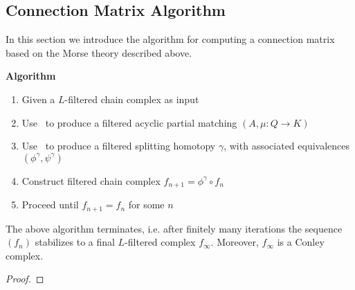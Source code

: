 \subsection{Connection Matrix Algorithm}

In this section we introduce the algorithm for computing a connection matrix based on the Morse theory described above.

{\bf Algorithm}
\begin{enumerate}
\item Given a $L$-filtered chain complex as input
\item Use~\cite[Algorithm 3.6]{focm} to produce a filtered acyclic partial matching $(A,\mu:Q\to K)$
\item Use~\cite[Algorithm 3.12]{focm} to produce a filtered splitting homotopy $\gamma$, with associated equivalences $(\phi^\gamma,\psi^\gamma)$
\item Construct filtered chain complex $f_{n+1}=\phi^\gamma \circ f_n$
\item Proceed until $f_{n+1}=f_n$ for some $n$
\end{enumerate}


\begin{thm}
The above algorithm terminates, i.e. after finitely many iterations the sequence $(f_n)$ stabilizes to a final $L$-filtered complex $f_\infty$.  Moreover, $f_\infty$ is a Conley complex.
\end{thm}
\begin{proof}

\end{proof}


%









